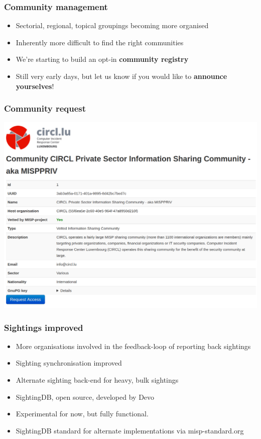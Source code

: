 \begin{frame}
  \frametitle{Community management}
  \begin{itemize}
    \item Sectorial, regional, topical groupings becoming more organised
    \item Inherently more difficult to find the right communities
    \item We're starting to build an opt-in {\bf community registry}
    \item Still very early days, but let us know if you would like to {\bf announce yourselves}!
  \end{itemize}
\end{frame}


\begin{frame}
  \frametitle{Community request}
  \begin{center}
    \includegraphics[width=1.0\linewidth]{community_request.png}
  \end{center}
\end{frame}

\begin{frame}
  \frametitle{Sightings improved}
  \begin{itemize}
    \item More organisations involved in the feedback-loop of reporting back sightings
    \item Sighting synchronisation improved
    \item Alternate sighting back-end for heavy, bulk sightings
    \item SightingDB, open source, developed by Devo
    \item Experimental for now, but fully functional.
    \item SightingDB standard for alternate implementations via misp-standard.org
  \end{itemize}
\end{frame}


